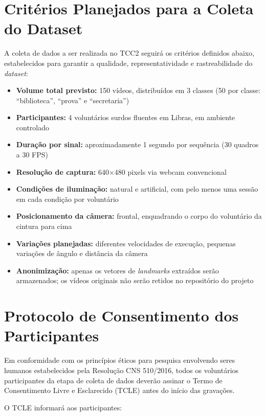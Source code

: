 
\section{Critérios Planejados para a Coleta do Dataset}

A coleta de dados a ser realizada no TCC2 seguirá os critérios definidos abaixo, estabelecidos para garantir a qualidade, representatividade e rastreabilidade do \textit{dataset}:

\begin{itemize}
    \item \textbf{Volume total previsto:} 150 vídeos, distribuídos em 3 classes (50 por classe: ``biblioteca'', ``prova'' e ``secretaria'')
    \item \textbf{Participantes:} 4 voluntários surdos fluentes em Libras, em ambiente controlado
    \item \textbf{Duração por sinal:} aproximadamente 1 segundo por sequência (30 quadros a 30 FPS)
    \item \textbf{Resolução de captura:} 640$\times$480 pixels via webcam convencional
    \item \textbf{Condições de iluminação:} natural e artificial, com pelo menos uma sessão em cada condição por voluntário
    \item \textbf{Posicionamento da câmera:} frontal, enquadrando o corpo do voluntário da cintura para cima
    \item \textbf{Variações planejadas:} diferentes velocidades de execução, pequenas variações de ângulo e distância da câmera
    \item \textbf{Anonimização:} apenas os vetores de \textit{landmarks} extraídos serão armazenados; os vídeos originais não serão retidos no repositório do projeto
\end{itemize}

\section{Protocolo de Consentimento dos Participantes}

Em conformidade com os princípios éticos para pesquisa envolvendo seres humanos estabelecidos pela Resolução CNS 510/2016, todos os voluntários participantes da etapa de coleta de dados deverão assinar o Termo de Consentimento Livre e Esclarecido (TCLE) antes do início das gravações.

O TCLE informará aos participantes:

